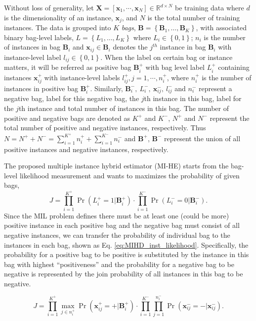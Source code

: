 \documentclass{article}
\begin{document}
	Without loss of generality, let $\mathbf{X}=\left[\mathbf{x}_1,\cdots,\mathbf{x}_N\right]\in\mathbb{R}^{d\times N}$ be training data where $d$ is the dimensionality of an instance, $\mathbf{x}_j$, and $N$ is the total number of training instances. The data is grouped into $K$ \textit{bags},  $\mathbf{B} = \left\{ \mathbf{B}_1, \ldots, \mathbf{B}_K\right\}$, with associated binary bag-level labels, $L = \left\{L_1, \ldots, L_K\right\}$ where $L_i \in \left\{ 0, 1\right\}$; $n_i$ is the number of instances in bag $\mathbf{B}_i$ and $\mathbf{x}_{ij} \in \mathbf{B}_i$ denotes the $j^{th}$ instance in bag $\mathbf{B}_i$ with instance-level label $l_{ij}\in\left\{ 0, 1\right\}$. When the label on certain bag or instance matters,  it will be referred as positive bag $\mathbf{B}_i^+$ with bag level label $L_i^+$ containing instances $\mathbf{x}_{ij}^+$ with instance-level labels $l_{ij}^+, j=1,\cdots, n_i^+$, where $n_i^+$ is the number of instances in positive bag $\mathbf{B}_i^+$. Similarly, $\mathbf{B}_i^-,\: L_i^-,\: \mathbf{x}_{ij}^-,\: l_{ij}^-$ and $n_i^-$ represent a negative bag, label for this negative bag, the $j$th instance in this bag, label for the $j$th instance and total number of instances in this bag.  The number of positive and negative bags are denoted as $K^+$ and $K^-$, $N^+$ and $N^-$ represent the total number of positive and negative instances, respectively. Thus $N=N^++N^-=\sum_{i=1}^{K^+}n_i^++\sum_{i=1}^{K^-}n_i^-$ and $\mathbf{B}^+$,  $\mathbf{B}^-$ represent the union of all positive instances and negative instances, respectively.
	
	The proposed multiple instance hybrid estimator (MI-HE) starts from the bag-level likelihood measurement and wants to maximizes the probability of given bags,
	\begin{equation}
	J=\prod_{i=1}^{K^+} \Pr(L_i^+=1|\mathbf{B}_i^+)\cdot \prod_{i=1}^{K^-}\Pr(L_i^-=0|\mathbf{B}_i^-).
	\label{eq:MIHD_bag_likelihood}
	\end{equation}
	Since the MIL problem defines there must be at least one (could be more) positive instance in each positive bag and the negative bag must consist of all negative instances, we can transfer the probability of individual bag to the instances in each bag, shown as Eq. \eqref{eq:MIHD_inst_likelihood}. Specifically, the probability for a positive bag to be positive is substituted by the instance in this bag with highest ``positiveness'' and the probability for a negative bag to be negative is represented by the join probability of all instances in this bag to be negative. 
	\begin{small}
	\begin{equation}
	J=\prod_{i=1}^{K^+} \max_{j\in n_i^+}\Pr(\mathbf{x}_{ij}^+=+|\mathbf{B}_i^+)\cdot \prod_{i=1}^{K^-}\prod_{j=1}^{n_i^-}\Pr(\mathbf{x}_{ij}^-=-|\mathbf{x}_{ij}^-).
	\label{eq:MIHD_inst_likelihood}
	\end{equation}
	\end{small}
\end{document}
